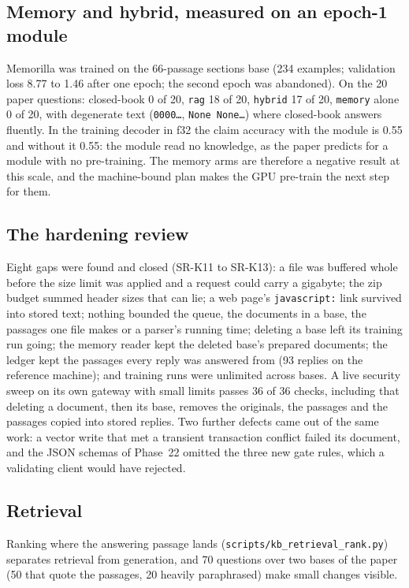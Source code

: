 \subsection{Memory and hybrid, measured on an epoch-1 module}

Memorilla was trained on the 66-passage sections base (234 examples; validation loss 8.77 to 1.46 after one epoch; the second epoch was abandoned). On the 20
paper questions: closed-book 0 of 20, \texttt{rag} 18 of 20, \texttt{hybrid} 17 of 20, \texttt{memory} alone 0 of 20, with degenerate text (\texttt{0000\ldots},
\texttt{None None\ldots}) where closed-book answers fluently. In the training decoder in f32 the claim accuracy with the module is 0.55 and without it 0.55: the
module read no knowledge, as the paper predicts for a module with no pre-training. The memory arms are therefore a negative result at this scale, and the
machine-bound plan makes the GPU pre-train the next step for them.

\subsection{The hardening review}

Eight gaps were found and closed (SR-K11 to SR-K13): a file was buffered whole before the size limit was applied and a request could carry a gigabyte; the zip
budget summed header sizes that can lie; a web page's \texttt{javascript:} link survived into stored text; nothing bounded the queue, the documents in a base, the
passages one file makes or a parser's running time; deleting a base left its training run going; the memory reader kept the deleted base's prepared documents; the
ledger kept the passages every reply was answered from (93 replies on the reference machine); and training runs were unlimited across bases. A live security sweep
on its own gateway with small limits passes 36 of 36 checks, including that deleting a document, then its base, removes the originals, the passages and the passages
copied into stored replies. Two further defects came out of the same work: a vector write that met a transient transaction conflict failed its document, and the
JSON schemas of Phase~22 omitted the three new gate rules, which a validating client would have rejected.

\subsection{Retrieval}

Ranking where the answering passage lands (\texttt{scripts/kb\_retrieval\_rank.py}) separates retrieval from generation, and 70 questions over two bases of the
paper (50 that quote the passages, 20 heavily paraphrased) make small changes visible.

